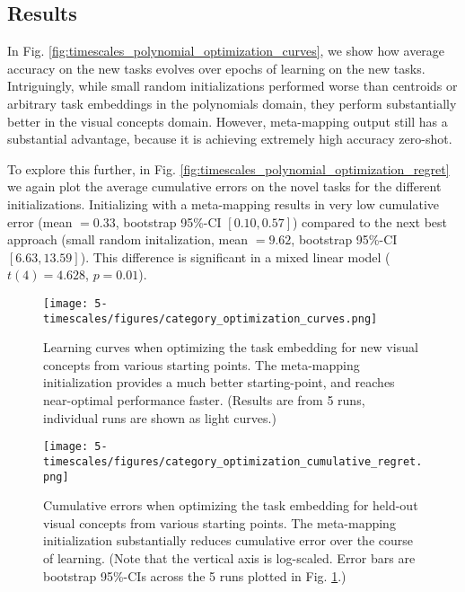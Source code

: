\subsection{Results}
In Fig. \ref{fig:timescales_polynomial_optimization_curves}, we show how average accuracy on the new tasks evolves over epochs of learning on the new tasks. Intriguingly, while small random initializations performed worse than centroids or arbitrary task embeddings in the polynomials domain, they perform substantially better in the visual concepts domain. However, meta-mapping output still has a substantial advantage, because it is achieving extremely high accuracy zero-shot. \par 
To explore this further, in Fig. \ref{fig:timescales_polynomial_optimization_regret} we again plot the average cumulative errors on the novel tasks for the different initializations. Initializing with a meta-mapping results in very low cumulative error (mean \(= 0.33\), bootstrap 95\%-CI \([0.10, 0.57]\)) compared to the next best approach (small random initalization, mean \(= 9.62\), bootstrap 95\%-CI \([6.63, 13.59]\)). This difference is significant in a mixed linear model (\(t(4) = 4.628\), \(p = 0.01\)). \par
\begin{figure}
\centering
\texttt{[image: 5-timescales/figures/category\_optimization\_curves.png]}
\caption[Learning curves when optimizing the task embedding for new visual concepts from various starting points.]{Learning curves when optimizing the task embedding for new visual concepts from various starting points. The meta-mapping initialization provides a much better starting-point, and reaches near-optimal performance faster. (Results are from 5 runs, individual runs are shown as light curves.)} \label{fig:timescales_category_optimization_curves}
\end{figure}

\begin{figure}
\centering
\texttt{[image: 5-timescales/figures/category\_optimization\_cumulative\_regret.png]}
\caption[Cumulative errors when optimizing the task embedding for held-out visual concepts from various starting points.]{Cumulative errors when optimizing the task embedding for held-out visual concepts from various starting points. The meta-mapping initialization substantially reduces cumulative error over the course of learning. (Note that the vertical axis is log-scaled. Error bars are bootstrap 95\%-CIs across the 5 runs plotted in Fig. \ref{fig:timescales_category_optimization_curves}.)} \label{fig:timescales_category_optimization_regret}
\end{figure}

